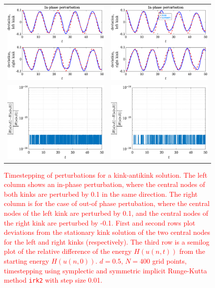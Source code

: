 \documentclass[12pt,reqno]{amsart}
\newcommand{\revised}[1]{ \textcolor{red}{#1} }
\begin{document}
\begin{figure}
	\begin{center}
	\begin{tabular}{cc}
	\includegraphics[width=6cm]{kakoscG1.eps} &
	\includegraphics[width=6cm]{kakoscG2.eps} \\
	\includegraphics[width=6cm]{kakoscG1energy.eps} &
	\includegraphics[width=6cm]{kakoscG2energy.eps} 
	\end{tabular}
	\end{center}
	\caption{\revised{Timestepping of perturbations for a kink-antikink solution. The left column shows an in-phase perturbation, where the central nodes of both kinks are perturbed by 0.1 in the same direction. The right column is for	the case of out-of phase pertubation, where the central nodes of the left kink are perturbed by 0.1, and the central nodes of the right kink are perturbed by -0.1. First and second rows plot deviations from the stationary kink solution of the two central nodes for the left and right kinks (respectively). The third row is a semilog plot of the relative difference of the energy $H(u(n, t))$ from the starting energy $H(u(n, 0))$. $d = 0.5$, $N = 400$ grid points, timestepping using symplectic and symmetric implicit Runge-Kutta method \texttt{irk2} with step size 0.01.}} 
	\label{fig:kaktimestep}
\end{figure}
\end{document}
